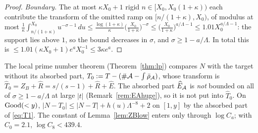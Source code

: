 \begin{proof}
\emph{Boundary.} The at most $\kappa X_0+1$ rigid $n\in[X_0,X_0(1+\kappa))$ each contribute the transform of the omitted ramp on
$[n/(1+\kappa),X_0)$, of modulus at most $\frac1\kappa\int_{n/(1+\kappa)}^{X_0}u^{-\sigma-1}\,du\le\frac{\log(1+\kappa)}\kappa
\bigl(\frac{X_0}{1+\kappa}\bigr)^{-\sigma}\le\bigl(\frac{X_0}{1+\kappa}\bigr)^{a/\Lambda-1}\le1.01X_0^{a/\Lambda-1}$: the support lies
above $1$, so the bound decreases in $\sigma$, and $\sigma\ge1-a/\Lambda$. In total this is
$\le1.01(\kappa X_0+1)e^aX_0^{-1}\le3\kappa e^a$.
\end{proof}

The local prime number theorem (Theorem~\ref{thm:lp}) compares $N$ with the target without its absorbed part,
$T_0:=T-(\#\mathcal{A}-\int\bar\rho_{\mathcal{A}})$, whose transform is $\widehat T_0=Z_B+\widehat R=s/(s-1)+\widehat R+\widehat E$. The absorbed part
$\widehat E_{\mathcal{A}}$ is \emph{not} bounded on all of $\sigma\ge1-a/\Lambda$ at large $|t|$ (Remark~\ref{rem:EAhuge}), so it is not put
into $\widehat T_0$. On $\mathrm{Good}(<y)$, $|N-T_0|\le|N-T|+h(u)\Lambda^{-8}+2$ on $[1,y]$ by the absorbed part of
\eqref{eq:T1}. The constant of Lemma~\ref{lem:ZBlow} enters only through $\log C_a$; with $C_0=2.1$, $\log C_8<439.4$.

